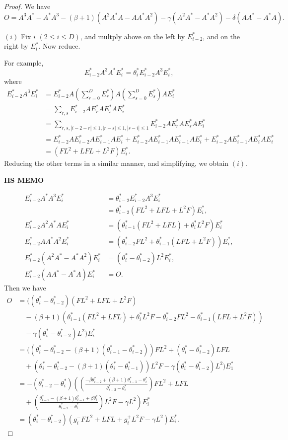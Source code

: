 \documentclass[
]{book}
\theoremstyle{definition}
\theoremstyle{definition}
\theoremstyle{definition}
\theoremstyle{definition}
\theoremstyle{remark}
\begin{document}
\begin{proof}

We have
\[O = A^3A^*-A^*A^3 - (\beta+1)(A^2A^*A-AA^*A^2)-\gamma(A^2A^*-A^*A^2)-\delta(AA^*-A^*A).\]

\((i)\) Fix \(i\) \((2\leq i\leq D)\), and multply above on the left by \(E^*_{i-2}\), and on the right by \(E^*_i\). Now reduce.

For example,
\[E^*_{i-2}A^3A^*E^*_i = \theta^*_i E^*_{i-2}A^3 E^*_i,\]
where
\begin{align}
E^*_{i-2}A^3 E^*_i & = E^*_{i-2}A\left(\sum_{r=0}^D E^*_r\right)A\left(\sum_{s=0}^D E^*_s\right)AE^*_i\\
& = \sum_{r,s}E^*_{i-2}AE^*_r AE^*_s AE^*_i\\
& = \sum_{r,s, |i-2-r|\leq 1, |r-s|\leq 1, |s-i|\leq 1}E^*_{i-2}AE^*_r AE^*_s AE^*_i\\
& = E^*_{i-2}AE^*_{i-2}AE^*_{i-1}AE^*_i + E^*_{i-2}AE^*_{i-1}AE^*_{i-1}AE^*_i + E^*_{i-2}AE^*_{i-1}AE^*_{i}AE^*_i\\
& = (FL^2 + LFL + L^2F)E^*_i.
\end{align}
Reducing the other terms in a similar manner, and simplifying, we obtain \((i)\).

\textbf{HS MEMO}

\begin{align}
E^*_{i-2}A^*A^3E^*_i & = \theta^*_{i-2}E^*_{i-2}A^3E^*_i\\
& = \theta^*_{i-2}(FL^2+LFL + L^2F)E^*_i,\\
E^*_{i-2}A^2A^*AE^*_i & = (\theta^*_{i-1}(FL^2+LFL) + \theta^*_iL^2F)E^*_i\\
E^*_{i-2}AA^*A^2E^*_i & = (\theta^*_{i-2}FL^2 + \theta^*_{i-1}(LFL+L^2F))E^*_i,\\
E^*_{i-2}(A^2A^*-A^*A^2)E^*_i & = (\theta^*_i-\theta^*_{i-2})L^2E^*_i,\\
E^*_{i-2}(AA^*-A^*A)E^*_i & = O.
\end{align}
Then we have
\begin{align}
O &= ((\theta^*_i-\theta^*_{i-2})(FL^2+LFL+L^2F)\\
& \quad -(\beta+1)(\theta^*_{i-1}(FL^2+LFL) + \theta^*_i L^2F - \theta^*_{i-2}FL^2 - \theta^*_{i-1}(LFL+L^2F)) \\
& \quad -\gamma(\theta^*_i-\theta^*_{i-2})L^2)E^*_i\\
& = ((\theta^*_i-\theta^*_{i-2}-(\beta+1)(\theta^*_{i-1}-\theta^*_{i-2}))FL^2 + (\theta^*_i-\theta^*_{i-2})LFL\\
& \quad + (\theta^*_i-\theta^*_{i-2}-(\beta+1)(\theta^*_i-\theta^*_{i-1}))L^2F - \gamma(\theta^*_i-\theta^*_{i-2})L^2)E^*_1\\
& = -(\theta^*_{i-2}-\theta^*_i)\left(\left(\frac{-\beta \theta^*_{i-2}+(\beta+1)\theta^*_{i-1}-\theta^*_i}{\theta^*_{i-2}-\theta^*_i}\right)FL^2+LFL\right.\\
& \quad + \left. \left(\frac{\theta^*_{i-2}-(\beta+1)\theta^*_{i-1}+\beta \theta^*_i}{\theta^*_{i-2}-\theta^*_i}\right)L^2F - \gamma L^2\right)E^*_i\\
& = (\theta^*_i-\theta^*_{i-2})(g^-_iFL^2 + LFL + g^+_iL^2F - \gamma L^2)E^*_i.
\end{align}


\end{proof}
\end{document}
